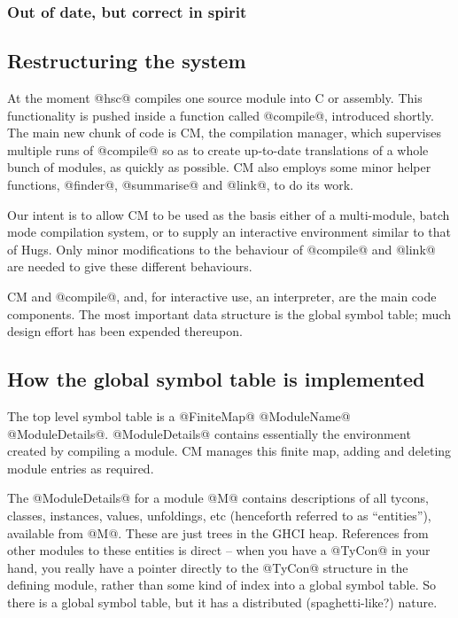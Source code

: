 \documentclass[11pt]{article}
\begin{document}
\subsubsection*{Out of date, but correct in spirit}

\subsection{Restructuring the system}

At the moment @hsc@ compiles one source module into C or assembly.
This functionality is pushed inside a function called @compile@,
introduced shortly.  The main new chunk of code is CM, the compilation manager,
which supervises multiple runs of @compile@ so as to create up-to-date
translations of a whole bunch of modules, as quickly as possible.
CM also employs some minor helper functions, @finder@, @summarise@ and
@link@, to do its work.

Our intent is to allow CM to be used as the basis either of a 
multi-module, batch mode compilation system, or to supply an
interactive environment similar to that of Hugs.
Only minor modifications to the behaviour of @compile@ and @link@ 
are needed to give these different behaviours.

CM and @compile@, and, for interactive use, an interpreter, are the
main code components.  The most important data structure is the global
symbol table; much design effort has been expended thereupon.


\subsection{How the global symbol table is implemented}

The top level symbol table is a @FiniteMap@ @ModuleName@
@ModuleDetails@.  @ModuleDetails@ contains essentially the environment
created by compiling a module.  CM manages this finite map, adding and
deleting module entries as required.

The @ModuleDetails@ for a module @M@ contains descriptions of all
tycons, classes, instances, values, unfoldings, etc (henceforth
referred to as ``entities''), available from @M@.  These are just
trees in the GHCI heap.  References from other modules to these
entities is direct -- when you have a @TyCon@ in your hand, you really
have a pointer directly to the @TyCon@ structure in the defining module,
rather than some kind of index into a global symbol table.  So there
is a global symbol table, but it has a distributed (spaghetti-like?)
nature.
\end{document}
